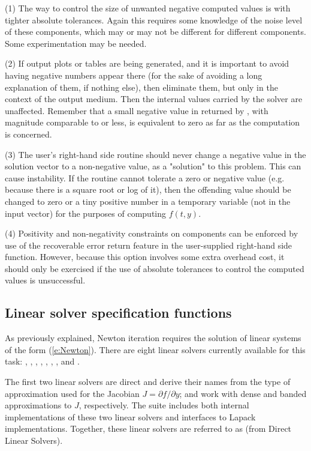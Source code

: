 (1) The way to control the size of unwanted negative computed values
is with tighter absolute tolerances.  Again this requires some
knowledge of the noise level of these components, which may or may not
be different for different components.  Some experimentation may be
needed.

(2) If output plots or tables are being generated, and it is important
to avoid having negative numbers appear there (for the sake of avoiding
a long explanation of them, if nothing else), then eliminate them, but
only in the context of the output medium.  Then the internal values carried
by the solver are unaffected.  Remember that a small negative value in 
returned by {\cvodes}, with magnitude comparable to  or less,
is equivalent to zero as far as the computation is concerned.

(3) The user's right-hand side routine  should never change a
negative value in the solution vector  to a non-negative value,
as a "solution" to this problem.  This can cause instability.  If the
 routine cannot tolerate a zero or negative value (e.g. because
there is a square root or log of it), then the offending value should
be changed to zero or a tiny positive number in a temporary variable
(not in the input  vector) for the purposes of computing $f(t,y)$.

(4) Positivity and non-negativity constraints on components can be
enforced by use of the recoverable error return feature in the
user-supplied right-hand side function.  However, because this option
involves some extra overhead cost, it should only be exercised if the
use of absolute tolerances to control the computed values is
unsuccessful.

\subsection{Linear solver specification functions}\label{sss:lin_solv_init}

As previously explained, Newton iteration requires the solution of
linear systems of the form (\ref{e:Newton}).  There are eight {\cvodes} linear
solvers currently available for this task: {\cvdense}, {\cvband},
{\cvklu}, {\cvsuperlumt}, {\cvdiag}, {\cvspgmr}, {\cvspbcg}, and {\cvsptfqmr}.

The first two linear solvers are direct and derive their names from the
type of approximation used for the Jacobian $J = \partial{f}/\partial{y}$;
{\cvdense} and {\cvband} work with dense and banded approximations to $J$,
respectively. The {\sundials} suite includes both internal implementations of
these two linear solvers and interfaces to Lapack implementations.
Together, these linear solvers are referred to as {\cvdls} (from Direct
Linear Solvers).

